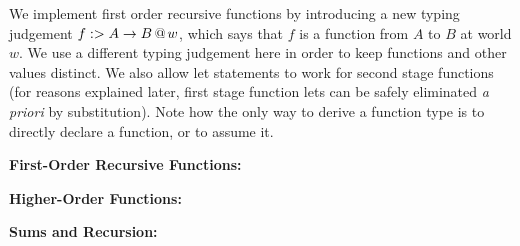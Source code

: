 \documentclass[]{article}
\begin{document}
\begin{abstrsyn}
We implement first order recursive functions by introducing a new typing judgement \mbox{${f}:>{A\to B}~\hspace{-0.15em}\text{@}\hspace{-0.2em}~{w}$},
which says that $f$ is a function from $A$ to $B$ at world $w$.  
We use a different typing judgement here in order to keep functions and other values distinct.
We also allow let statements to work for second stage functions 
(for reasons explained later, first stage function lets can be safely eliminated \emph{a priori} by substitution).
Note how the only way to derive a function type is to directly declare a function, or to assume it.
\begin{framed}
\noindent\textbf{First-Order Recursive Functions:}
\end{framed}

\begin{framed}
\noindent\textbf{Higher-Order Functions:}
\end{framed}

\begin{framed}
\noindent\textbf{Sums and Recursion:}
\end{framed}


\end{abstrsyn}
\end{document}
